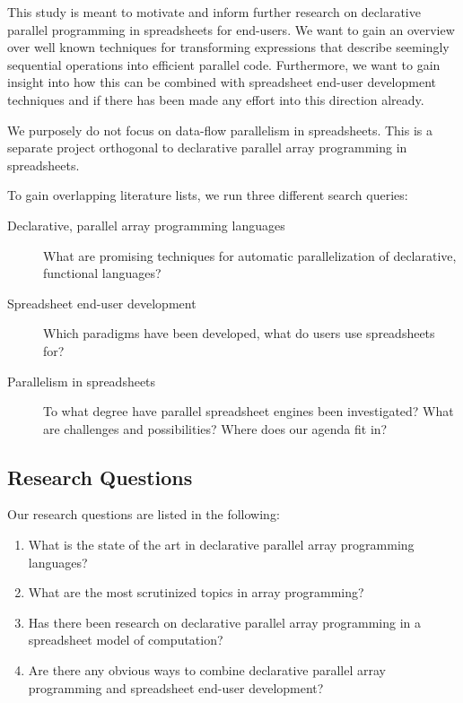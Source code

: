 \documentclass[a4paper]{article}
\begin{document}
This study is meant to motivate and inform further research on
declarative parallel programming in spreadsheets for end-users. We
want to gain an overview over well known techniques for transforming
expressions that describe seemingly sequential operations into
efficient parallel code. Furthermore, we want to gain insight into how
this can be combined with spreadsheet end-user development techniques
and if there has been made any effort into this direction
already. 

We purposely do not focus on data-flow parallelism in
spreadsheets. This is a separate project orthogonal to declarative
parallel array programming in spreadsheets.

To gain overlapping literature lists, we run three different search queries:

\begin{description}
\item[Declarative, parallel array programming languages] What are
  promising techniques for automatic parallelization of declarative,
  functional languages?
\item[Spreadsheet end-user development] Which paradigms have been
  developed, what do users use spreadsheets for?
\item[Parallelism in spreadsheets] To what degree have parallel
  spreadsheet engines been investigated? What are challenges and
  possibilities? Where does our agenda fit in?
\end{description}

\subsection{Research Questions}
\label{sec:research-questions}

Our research questions are listed in the following:

\begin{enumerate}
\item What is the state of the art in declarative parallel array
  programming languages?
\item What are the most scrutinized topics in array programming?
\item Has there been research on declarative parallel array
  programming in a spreadsheet model of computation?
\item Are there any obvious ways to combine declarative parallel array
  programming and spreadsheet end-user development?
\end{enumerate}
\end{document}
